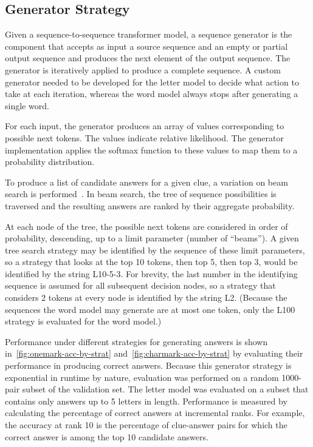 \documentclass[letterpaper]{article} %
\begin{document}
\begin{NoHyper}
\section{Generator Strategy}
\label{sec:generator}

Given a sequence-to-sequence transformer model, a sequence generator is the component that accepts as input a source
sequence and an empty or partial output sequence and produces the next element of the output sequence.
The generator is iteratively applied to produce a complete sequence.
A custom generator needed to be developed for the letter model to decide what action to take at
each iteration, whereas the word model always stops after generating a single word.

For each input, the generator produces an array of values corresponding to possible next tokens.
The values indicate relative likelihood.
The generator implementation applies the softmax function to these values to map them to a probability distribution.

To produce a list of candidate answers for a given clue, a variation on beam search is performed~\cite{wu2016googles}.
In beam search, the tree of sequence possibilities is traversed and the resulting answers are ranked by their aggregate probability.

At each node of the tree, the possible next tokens are considered in order of probability, descending, up to a limit parameter (number of ``beams'').
A given tree search strategy may be identified by the sequence of these limit parameters, so a strategy that looks at the top 10 tokens, then top 5, then top 3, would be identified by the string L10-5-3.
For brevity, the last number in the identifying sequence is assumed for all subsequent decision nodes, so a strategy that considers 2 tokens at every node is identified by the string L2. (Because the sequences the word model may generate are at most one token, only the L100 strategy is evaluated for the word model.)

Performance under different strategies for generating answers is shown in~\autoref{fig:onemark-acc-by-strat} and~\autoref{fig:charmark-acc-by-strat} by evaluating their performance in producing correct answers.
Because this generator strategy is exponential in runtime by nature, evaluation was performed on a random 1000-pair subset of the validation set.
The letter model was evaluated on a subset that contains only answers up to 5 letters in length.
Performance is measured by calculating the percentage of correct answers at incremental ranks.
For example, the accuracy at rank 10 is the percentage of clue-answer pairs for which the correct answer is among the top 10 candidate answers.


\end{NoHyper}
\end{document}
